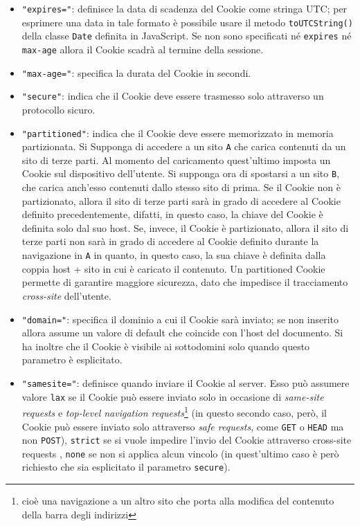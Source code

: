 \documentclass[a4paper, 12pt, twoside, openright]{book}
\begin{document}
\begin{itemize}
\item\texttt{"expires="}: definisce la data di scadenza del Cookie come stringa UTC; per esprimere una data in tale formato è possibile usare il metodo \texttt{toUTCString()} della classe \texttt{Date} definita in JavaScript\cite{MDN_Web_docs:cookies}. Se non sono specificati né \texttt{expires} né \texttt{max-age} allora il Cookie scadrà al termine della sessione\cite{MDN_Web_docs:cookies}.
\item\texttt{"max-age="}: specifica la durata del Cookie in secondi\cite{MDN_Web_docs:cookies}.
\item\texttt{"secure"}: indica che il Cookie deve essere trasmesso solo attraverso un protocollo sicuro\cite{MDN_Web_docs:cookies}.
\item\texttt{"partitioned"}: indica che il Cookie deve essere memorizzato in memoria partizionata\cite{MDN_Web_docs:cookies}. Si Supponga di accedere a un sito \texttt{A} che carica contenuti da un sito di terze parti. Al momento del caricamento quest'ultimo imposta un Cookie sul dispositivo dell'utente. Si supponga ora di spostarsi a un sito \texttt{B}, che carica anch'esso contenuti dallo stesso sito di prima. Se il Cookie non è partizionato, allora il sito di terze parti sarà in grado di accedere al Cookie definito precedentemente, difatti, in questo caso, la chiave del Cookie è definita solo dal suo host. Se, invece, il Cookie è partizionato, allora il sito di terze parti non sarà in grado di accedere al Cookie definito durante la navigazione in \texttt{A} in quanto, in questo caso, la sua chiave è definita dalla coppia host + sito in cui è caricato il contenuto\cite{MDN_Web_docs:CHIPS}. Un partitioned Cookie permette di garantire maggiore sicurezza, dato che impedisce il tracciamento \textit{cross-site} dell'utente\cite{MDN_Web_docs:CHIPS}.
\item\texttt{"domain="}: specifica il dominio a cui il Cookie sarà inviato; se non inserito allora assume un valore di default che coincide con l'host del documento. Si ha inoltre che il Cookie è visibile ai sottodomini solo quando questo parametro è esplicitato\cite{MDN_Web_docs:cookies}.
\item\texttt{"samesite="}: definisce quando inviare il Cookie al server\cite{MDN_Web_docs:cookies}. Esso può assumere valore \texttt{lax} se il Cookie può essere inviato solo in occasione di \textit{same-site requests} e \textit{top-level navigation requests}\footnote{cioè una navigazione a un altro sito che porta alla modifica del contenuto della barra degli indirizzi\cite{Stack_overflow:samesite}}\cite{MDN_Web_docs:cookies} (in questo secondo caso, però, il Cookie può essere inviato solo attraverso \textit{safe requests}, come \texttt{GET} o \texttt{HEAD} ma non \texttt{POST}\cite{Stack_overflow:samesite}), \texttt{strict} se si vuole impedire l'invio del Cookie attraverso cross-site requests \cite{MDN_Web_docs:cookies}, \texttt{none} se non si applica alcun vincolo\cite{MDN_Web_docs:cookies} (in quest'ultimo caso è però richiesto che sia esplicitato il parametro \texttt{secure}\cite{MDN_Web_docs:HTTP_cookies}).

\end{itemize}
\end{document}
